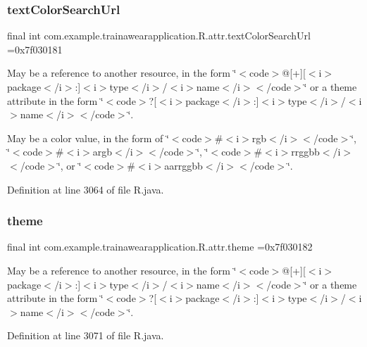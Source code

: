 \subsubsection{\texorpdfstring{textColorSearchUrl}{textColorSearchUrl}}
{\footnotesize\ttfamily final int com.\+example.\+trainawearapplication.\+R.\+attr.\+text\+Color\+Search\+Url =0x7f030181\hspace{0.3cm}{\ttfamily [static]}}

May be a reference to another resource, in the form \char`\"{}$<$code$>$@\mbox{[}+\mbox{]}\mbox{[}$<$i$>$package$<$/i$>$\+:\mbox{]}$<$i$>$type$<$/i$>$/$<$i$>$name$<$/i$>$$<$/code$>$\char`\"{} or a theme attribute in the form \char`\"{}$<$code$>$?\mbox{[}$<$i$>$package$<$/i$>$\+:\mbox{]}$<$i$>$type$<$/i$>$/$<$i$>$name$<$/i$>$$<$/code$>$\char`\"{}. 

May be a color value, in the form of \char`\"{}$<$code$>$\#$<$i$>$rgb$<$/i$>$$<$/code$>$\char`\"{}, \char`\"{}$<$code$>$\#$<$i$>$argb$<$/i$>$$<$/code$>$\char`\"{}, \char`\"{}$<$code$>$\#$<$i$>$rrggbb$<$/i$>$$<$/code$>$\char`\"{}, or \char`\"{}$<$code$>$\#$<$i$>$aarrggbb$<$/i$>$$<$/code$>$\char`\"{}. 

Definition at line 3064 of file R.\+java.

\mbox{\label{classcom_1_1example_1_1trainawearapplication_1_1_r_1_1attr_af0b5647a719d67e15e9a1c633c7d0cba}} 
\subsubsection{\texorpdfstring{theme}{theme}}
{\footnotesize\ttfamily final int com.\+example.\+trainawearapplication.\+R.\+attr.\+theme =0x7f030182\hspace{0.3cm}{\ttfamily [static]}}

May be a reference to another resource, in the form \char`\"{}$<$code$>$@\mbox{[}+\mbox{]}\mbox{[}$<$i$>$package$<$/i$>$\+:\mbox{]}$<$i$>$type$<$/i$>$/$<$i$>$name$<$/i$>$$<$/code$>$\char`\"{} or a theme attribute in the form \char`\"{}$<$code$>$?\mbox{[}$<$i$>$package$<$/i$>$\+:\mbox{]}$<$i$>$type$<$/i$>$/$<$i$>$name$<$/i$>$$<$/code$>$\char`\"{}. 

Definition at line 3071 of file R.\+java.

